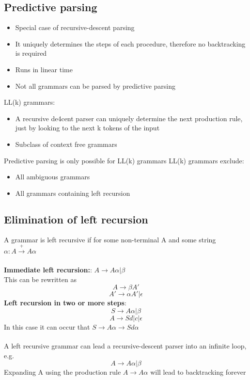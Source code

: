 \documentclass{article}[18pt]
\begin{document}
\subsection{Predictive parsing}
\begin{itemize}
	\item Special case of recursive-descent parsing
	\item It uniquely determines the steps of each procedure, therefore no backtracking is required
	\item Runs in linear time
	\item Not all grammars can be parsed by predictive parsing
\end{itemize}
LL(k) grammars:
\begin{itemize}
	\item A recursive de4cent parser can uniquely determine the next production rule, just by looking to the next k tokens of the input
	\item Subclass of context free grammars 
\end{itemize}
Predictive parsing is only possible for LL(k) grammars
LL(k) grammars exclude:
\begin{itemize}
	\item All ambiguous grammars
	\item All grammars containing left recursion
\end{itemize}
\subsection{Elimination of left recursion}
A grammar is left recursive if for some non-terminal A and some string $\alpha: A\xrightarrow{+}A\alpha$\\
\\
\textbf{Immediate left recursion:}: $A\rightarrow A\alpha | \beta$\\
This can be rewritten as
$$A\rightarrow \beta A'$$
$$A'\rightarrow \alpha A' | \epsilon$$
\textbf{Left recursion in two or more steps}:
$$S\rightarrow A\alpha | \beta$$
$$A\rightarrow Sd|c|\epsilon$$
In this case it can occur that $S\rightarrow A\alpha \rightarrow Sd\alpha$\\
\\
A left recursive grammar can lead a recursive-descent parser into an infinite loop, e.g.
$$A\rightarrow A\alpha|\beta$$
Expanding A using the production rule $A\rightarrow A\alpha$ will lead to backtracking forever
\end{document}

